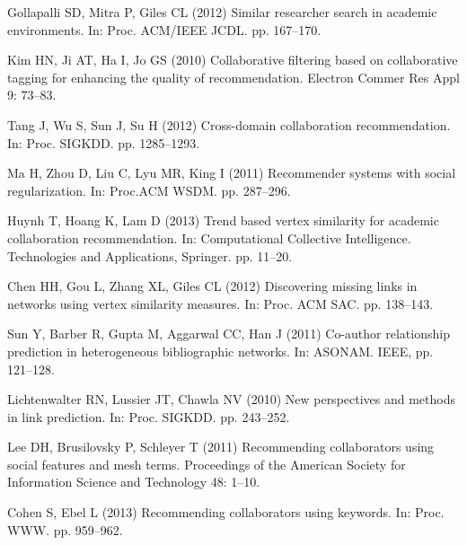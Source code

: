 \documentclass[10pt,letterpaper]{article}
\begin{document}
\begin{thebibliography}{10}
Gollapalli SD, Mitra P, Giles CL (2012) Similar researcher search in academic
  environments.
\newblock In: Proc. ACM/IEEE JCDL. pp. 167--170.

Kim HN, Ji AT, Ha I, Jo GS (2010) Collaborative filtering based on
  collaborative tagging for enhancing the quality of recommendation.
\newblock Electron Commer Res Appl 9: 73--83.

Tang J, Wu S, Sun J, Su H (2012) Cross-domain collaboration recommendation.
\newblock In: Proc. SIGKDD. pp. 1285--1293.

Ma H, Zhou D, Liu C, Lyu MR, King I (2011) Recommender systems with social
  regularization.
\newblock In: Proc.ACM WSDM. pp. 287--296.

Huynh T, Hoang K, Lam D (2013) Trend based vertex similarity for academic
  collaboration recommendation.
\newblock In: Computational Collective Intelligence. Technologies and
  Applications, Springer. pp. 11--20.

Chen HH, Gou L, Zhang XL, Giles CL (2012) Discovering missing links in networks
  using vertex similarity measures.
\newblock In: Proc. ACM SAC. pp. 138--143.

Sun Y, Barber R, Gupta M, Aggarwal CC, Han J (2011) Co-author relationship
  prediction in heterogeneous bibliographic networks.
\newblock In: ASONAM. IEEE, pp. 121--128.

Lichtenwalter RN, Lussier JT, Chawla NV (2010) New perspectives and methods in
  link prediction.
\newblock In: Proc. SIGKDD. pp. 243--252.

Lee DH, Brusilovsky P, Schleyer T (2011) Recommending collaborators using
  social features and mesh terms.
\newblock Proceedings of the American Society for Information Science and
  Technology 48: 1--10.

Cohen S, Ebel L (2013) Recommending collaborators using keywords.
\newblock In: Proc. WWW. pp. 959--962.


\end{thebibliography}
\end{document}
